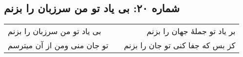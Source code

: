 \begin{center}
\section*{شماره ۲۰: بی یاد تو من سرزبان را بزنم}
\label{sec:020}
\begin{longtable}{l p{0.5cm} r}
بی یاد تو من سرزبان را بزنم
&&
بر یاد تو جملهٔ جهان را بزنم
\\
تو جان منی ومن از آن میترسم
&&
کز بس که جفا کنی تو جان را بزنم
\\
\end{longtable}
\end{center}
